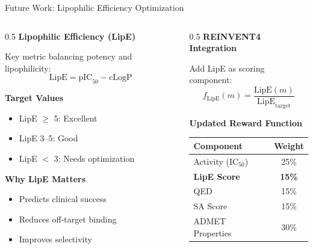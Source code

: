 \documentclass[aspectratio=169,xcolor=table]{beamer}
\begin{document}
\begin{frame}{Future Work: Lipophilic Efficiency Optimization}

\begin{columns}
\begin{column}{0.5\textwidth}
\textbf{Lipophilic Efficiency (LipE)}

\vspace{0.2cm}

Key metric balancing potency and lipophilicity:
\begin{equation*}
\text{LipE} = \text{pIC}_{50} - \text{cLogP}
\end{equation*}

\vspace{0.2cm}

\textbf{Target Values}
\begin{itemize}\setlength{\itemsep}{2pt}
    \item LipE $\geq$ 5: Excellent
    \item LipE 3--5: Good
    \item LipE $<$ 3: Needs optimization
\end{itemize}

\vspace{0.3cm}

\textbf{Why LipE Matters}
\begin{itemize}\setlength{\itemsep}{0pt}
    \item Predicts clinical success
    \item Reduces off-target binding
    \item Improves selectivity
\end{itemize}
\end{column}

\begin{column}{0.5\textwidth}
\textbf{REINVENT4 Integration}

\vspace{0.2cm}

Add LipE as scoring component:
\begin{equation*}
f_{\text{LipE}}(m) = \frac{\text{LipE}(m)}{\text{LipE}_{\text{target}}}
\end{equation*}

\vspace{0.2cm}

\textbf{Updated Reward Function}
\begin{table}
\scriptsize
\begin{tabular}{lc}
\toprule
\textbf{Component} & \textbf{Weight} \\
\midrule
Activity (IC$_{50}$) & 25\% \\
\textbf{LipE Score} & \textbf{15\%} \\
QED & 15\% \\
SA Score & 15\% \\
ADMET Properties & 30\% \\
\bottomrule
\end{tabular}
\end{table}


\end{column}
\end{columns}
\end{frame}
\end{document}
